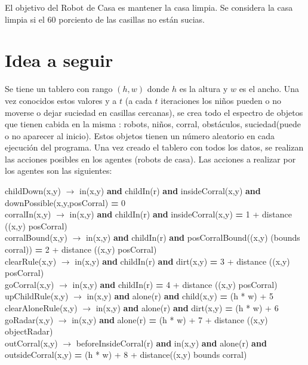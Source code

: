\documentclass{book}
\begin{document}
	El objetivo del Robot de Casa es mantener la casa limpia. Se considera la casa limpia si el 60 porciento de las casillas no est\'an sucias.
	
	\section{Idea a seguir}
	
	Se tiene un tablero con rango $(h,w)$ donde $h$ es la altura y $w$ es el ancho. Una vez conocidos estos valores y a $t$ (a cada $t$ iteraciones los niños pueden o no moverse o dejar suciedad en casillas cercanas), se crea todo el espectro de objetos que tienen cabida en la misma : robots, ni\~nos, corral, obst\'aculos, suciedad(puede o no aparecer al inicio). Estos objetos tienen un n\'umero aleatorio en cada ejecuci\'on del programa. Una vez creado el tablero con todos los datos, se realizan las acciones posibles en los agentes (robots de casa). 
	Las acciones a realizar por los agentes son las siguientes:
	\begin{center}
		childDown(x,y) $\rightarrow$ in(x,y) \textbf{and} childIn(r) \textbf{and} insideCorral(x,y) \textbf{and} downPossible(x,y,posCorral) \textbf{=} 0 \\
		corralIn(x,y) $\rightarrow$ in(x,y) \textbf{and} childIn(r) \textbf{and} insideCorral(x,y) \textbf{=} 1 + distance ((x,y) posCorral) \\
		corralBound(x,y) $\rightarrow$ in(x,y) \textbf{and} childIn(r) \textbf{and} posCorralBound((x,y) (bounds corral)) \textbf{=} 2 + distance ((x,y) posCorral) \\
		clearRule(x,y) $\rightarrow$ in(x,y) \textbf{and} childIn(r) \textbf{and} dirt(x,y) \textbf{=} 3 + distance ((x,y) posCorral) \\
		goCorral(x,y) $\rightarrow$ in(x,y) \textbf{and} childIn(r) \textbf{=} 4  + distance ((x,y) posCorral) \\
		upChildRule(x,y) $\rightarrow$ in(x,y) \textbf{and} alone(r) \textbf{and} child(x,y) \textbf{=} (h * w) + 5 \\
		clearAloneRule(x,y) $\rightarrow$ in(x,y) \textbf{and} alone(r) \textbf{and} dirt(x,y) \textbf{=} (h * w) + 6 \\
		goRadar(x,y) $\rightarrow$ in(x,y) \textbf{and} alone(r) \textbf{=} (h * w) + 7 + distance ((x,y) objectRadar) \\
		outCorral(x,y) $\rightarrow$ beforeInsideCorral(r) \textbf{and} in(x,y) \textbf{and} alone(r) \textbf{and} outsideCorral(x,y) \textbf{=} (h * w) + 8 + distance((x,y) bounds corral)
	
	\end{center}
	
\end{document}
